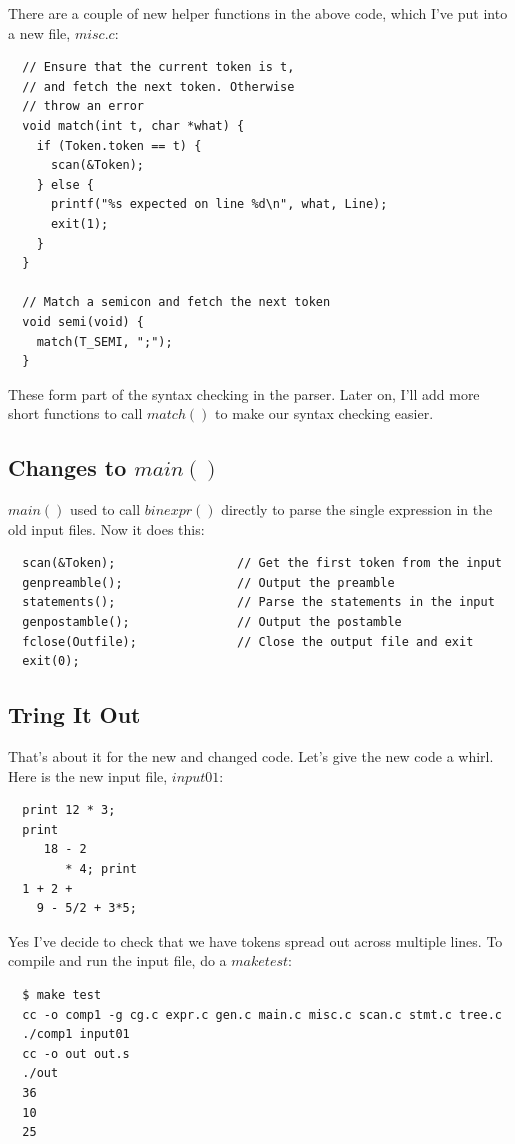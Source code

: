 \documentclass[journal, onecolumn, 12pt]{IEEEtran}
\begin{document}
There are a couple of new helper functions in the above code, which I've put into a new file, $misc.c$:

\begin{lstlisting}
  // Ensure that the current token is t,
  // and fetch the next token. Otherwise
  // throw an error 
  void match(int t, char *what) {
    if (Token.token == t) {
      scan(&Token);
    } else {
      printf("%s expected on line %d\n", what, Line);
      exit(1);
    }
  }
  
  // Match a semicon and fetch the next token
  void semi(void) {
    match(T_SEMI, ";");
  }
\end{lstlisting}

These form part of the syntax checking in the parser. Later on, I'll add more short functions to call $match()$ to make our syntax checking easier.

\subsection{Changes to $main()$}

$main()$ used to call $binexpr()$ directly to parse the single expression in the old input files. Now it does this:

\begin{lstlisting}
  scan(&Token);                 // Get the first token from the input
  genpreamble();                // Output the preamble
  statements();                 // Parse the statements in the input
  genpostamble();               // Output the postamble
  fclose(Outfile);              // Close the output file and exit
  exit(0);
\end{lstlisting}

\subsection{Tring It Out}

That's about it for the new and changed code. Let's give the new code a whirl. Here is the new input file, $input01$:

\begin{lstlisting}
  print 12 * 3;
  print 
     18 - 2
        * 4; print
  1 + 2 +
    9 - 5/2 + 3*5;
\end{lstlisting}

Yes I've decide to check that we have tokens spread out across multiple lines. To compile and run the input file, do a $make test$:

\begin{lstlisting}
  $ make test
  cc -o comp1 -g cg.c expr.c gen.c main.c misc.c scan.c stmt.c tree.c
  ./comp1 input01
  cc -o out out.s
  ./out
  36
  10
  25
\end{lstlisting}
\end{document}
